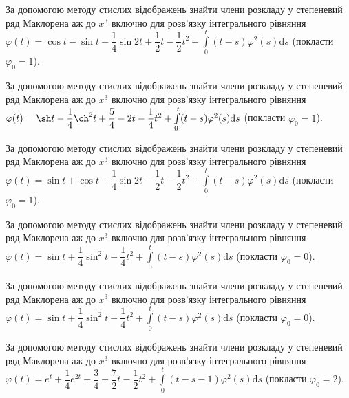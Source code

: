 \documentclass[12pt]{extarticle}
\begin{document}
\begin{Exercise}
За допомогою методу стислих відображень знайти члени розкладу у степеневий ряд Маклорена аж до $x^3$ включно для розв’язку інтегрального рівняння $\varphi (t) = \cos t - \sin t - \dfrac{1}{4} \sin 2t + \dfrac{1}{2} t - \dfrac{1}{2} t^2 + \int\limits_{0}^{t} (t-s) \varphi^2(s) \mathrm{d}s$ (покласти $\varphi_0 = 1$).
\end{Exercise}

\begin{Exercise}
За допомогою методу стислих відображень знайти члени розкладу у степеневий ряд Маклорена аж до $x^3$ включно для розв’язку інтегрального рівняння $\varphi (t) = \sh t - \dfrac{1}{4} \ch^2 t + \dfrac{5}{4} - 2 t - \dfrac{1}{4} t^2 + \int\limits_{0}^{t} (t - s) \varphi^2(s) \mathrm{d}s$ (покласти $\varphi_0 = 1$).
\end{Exercise}

\begin{Exercise}
За допомогою методу стислих відображень знайти члени розкладу у степеневий ряд Маклорена аж до $x^3$ включно для розв’язку інтегрального рівняння $\varphi (t) = \sin t + \cos t + \dfrac{1}{4} \sin 2t -\dfrac{1}{2} t - \dfrac{1}{2} t^2 + \int\limits_{0}^{t} (t-s) \varphi^2(s) \mathrm{d}s$ (покласти $\varphi_0 = 1$).
\end{Exercise}

\begin{Exercise}
За допомогою методу стислих відображень знайти члени розкладу у степеневий ряд Маклорена аж до $x^3$ включно для розв’язку інтегрального рівняння $\varphi (t) = \sin t + \dfrac{1}{4} \sin^2 t - \dfrac{1}{4} t^2 + \int\limits_{0}^{t} (t-s) \varphi^2(s) \mathrm{d}s$ (покласти $\varphi_0 = 0$).
\end{Exercise}

\begin{Exercise}
За допомогою методу стислих відображень знайти члени розкладу у степеневий ряд Маклорена аж до $x^3$ включно для розв’язку інтегрального рівняння $\varphi (t) = \sin t + \dfrac{1}{4} \sin^2 t - \dfrac{1}{4} t^2 + \int\limits_{0}^{t} (t-s)\varphi^2(s) \mathrm{d}s$ (покласти $\varphi_0 = 0$).
\end{Exercise}

\begin{Exercise}
За допомогою методу стислих відображень знайти члени розкладу у степеневий ряд Маклорена аж до $x^3$ включно для розв’язку інтегрального рівняння $\varphi (t) = e^t + \dfrac{1}{4} e^{2t} + \dfrac{3}{4} + \dfrac{7}{2} t - \dfrac{1}{2} t^2 + \int\limits_{0}^{t} (t-s-1)\varphi^2(s) \mathrm{d}s$ (покласти $\varphi_0 = 2$).
\end{Exercise}
\end{document}
